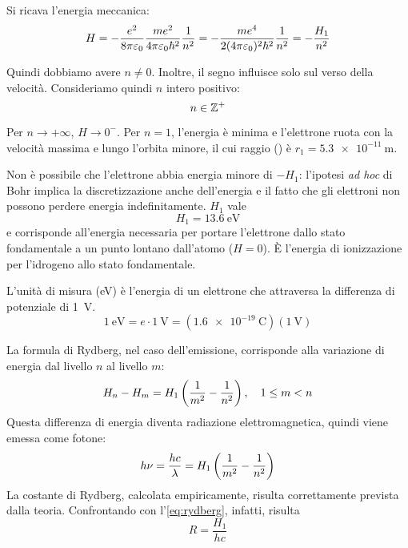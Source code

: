 Si ricava l'energia meccanica:
\begin{equation}
\label{eq:energia_bohr}
    H = - \frac{e^2}{8 \pi \varepsilon_0} \frac{m e^2}{4\pi \varepsilon_0 \hbar^2} \frac{1}{n^2} = - \frac{m e^4}{2 (4\pi \varepsilon_0)^2 \hbar^2} \frac{1}{n^2} = -\frac{H_1}{n^2}
\end{equation}

Quindi dobbiamo avere $n \ne 0$.
Inoltre, il segno influisce solo sul verso della velocità.
Consideriamo quindi $n$ intero positivo:
\begin{equation}
    n \in \mathbb{Z}^+
\end{equation}

Per $n \to +\infty$, $H \to 0^-$.
Per $n = 1$, l'energia è minima e l'elettrone ruota con la velocità massima e lungo l'orbita minore, il cui raggio () è $r_1 = \qty{5.3e-11}{\metre}$.

Non è possibile che l'elettrone abbia energia minore di $-H_1$: l'ipotesi \textit{ad hoc} di Bohr implica la discretizzazione anche dell'energia e il fatto che gli elettroni non possono perdere energia indefinitamente.
$H_1$ vale
\begin{equation}
    H_1 = \qty{13.6}{\electronvolt}
\end{equation}
e corrisponde all'energia necessaria per portare l'elettrone dallo stato fondamentale a un punto lontano dall'atomo ($H = 0$).
È l'energia di ionizzazione per l'idrogeno allo stato fondamentale.

L'unità di misura  (\unit{\electronvolt}) è l'energia di un elettrone che attraversa la differenza di potenziale di \qty{1}{\volt}.
\begin{equation}
    \qty{1}{\electronvolt}
    = e \cdot \qty{1}{\volt}
    = (\qty{1.6e-19}{\coulomb}) (\qty{1}{\volt})
\end{equation}

La formula di Rydberg, nel caso dell'emissione, corrisponde alla variazione di energia dal livello $n$ al livello $m$:
\begin{equation}
    H_n - H_m = H_1 \left( \frac{1}{m^2} - \frac{1}{n^2} \right), \quad 1 \le m < n
\end{equation}
Questa differenza di energia diventa radiazione elettromagnetica, quindi viene emessa come fotone:
\begin{equation}
    h \nu = \frac{h c}{\lambda} = H_1 \left( \frac{1}{m^2} - \frac{1}{n^2} \right)
\end{equation}
La costante di Rydberg, calcolata empiricamente, risulta correttamente prevista dalla teoria.
Confrontando con l'\cref{eq:rydberg}, infatti, risulta
\begin{equation}
    R = \frac{H_1}{h c}
\end{equation}


